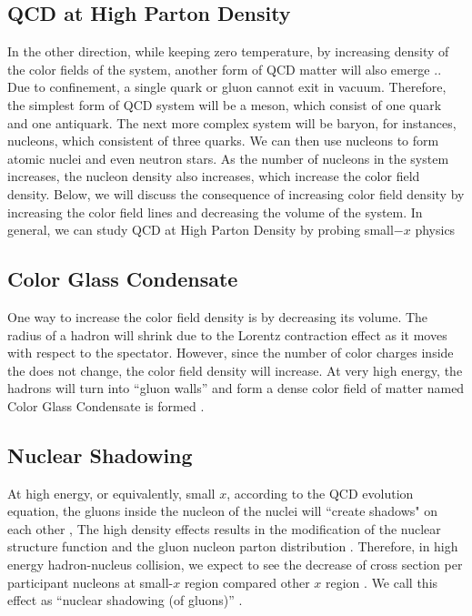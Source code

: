 \subsection{QCD at High Parton Density}

In the other direction, while keeping zero temperature, by increasing density of the color fields of the system, another form of QCD matter will also emerge \cite{CondensedQCD}.. Due to confinement, a single quark or gluon cannot exit in vacuum. Therefore, the simplest form of QCD system will be a meson, which consist of one quark and one antiquark. The next more complex system will be baryon, for instances, nucleons, which consistent of three quarks. We can then use nucleons to form atomic nuclei and even neutron stars. As the number of nucleons in the system increases, the nucleon density also increases, which increase the color field density. Below, we will discuss the consequence of increasing color field density by increasing the color field lines and decreasing the volume of the system. In general, we can study QCD at High Parton Density by probing small$-x$ physics \cite{SmallX}  


\subsection{Color Glass Condensate}

One way to increase the color field density is by decreasing its volume. The radius of a hadron will shrink due to the Lorentz contraction effect as it moves with respect to the spectator. However, since the number of color charges inside the does not change, the color field density will increase. At very high energy, the hadrons will turn into ``gluon walls'' \cite{GluonWalls} and form a dense color field of matter \cite{DenseColorField} named Color Glass Condensate is formed \cite{CGCPaper}.

\subsection{Nuclear Shadowing}

At high energy, or equivalently, small $x$, according to the QCD evolution equation, the gluons inside the nucleon of the nuclei will ``create shadows" on each other \cite{IntroShadow}, The high density effects results in the modification of the nuclear structure function and the gluon nucleon parton distribution \cite{DenseQCD}. Therefore, in high energy hadron-nucleus collision, we expect to see the decrease of cross section per participant nucleons at small-$x$ region compared other $x$ region \cite{ExShadow}. We call this effect as ``nuclear shadowing (of gluons)'' \cite{NuclearShadowing}. 
